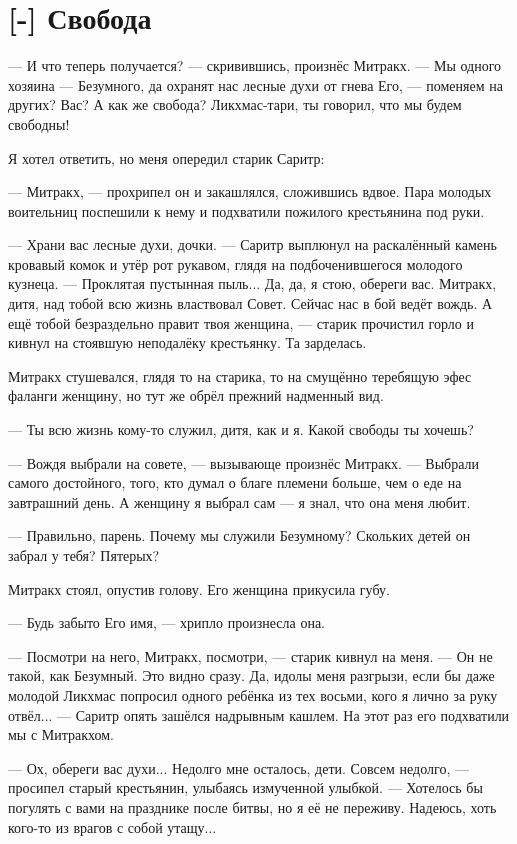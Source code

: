 \section{[-] Свобода}

\textspace

--- И что теперь получается? --- скривившись, произнёс Митракх.
--- Мы одного хозяина --- Безумного, да охранят нас лесные духи от гнева Его, --- поменяем на других?
Вас?
А как же свобода?
Ликхмас-тари, ты говорил, что мы будем свободны!

Я хотел ответить, но меня опередил старик Саритр:

--- Митракх, --- прохрипел он и закашлялся, сложившись вдвое.
Пара молодых воительниц поспешили к нему и подхватили пожилого крестьянина под руки.

--- Храни вас лесные духи, дочки. --- Саритр выплюнул на раскалённый камень кровавый комок и утёр рот рукавом, глядя на подбоченившегося молодого кузнеца.
--- Проклятая пустынная пыль...
Да, да, я стою, обереги вас.
Митракх, дитя, над тобой всю жизнь властвовал Совет.
Сейчас нас в бой ведёт вождь.
А ещё тобой безраздельно правит твоя женщина, --- старик прочистил горло и кивнул на стоявшую неподалёку крестьянку.
Та зарделась.

Митракх стушевался, глядя то на старика, то на смущённо теребящую эфес фаланги женщину, но тут же обрёл прежний надменный вид.

--- Ты всю жизнь кому-то служил, дитя, как и я.
Какой свободы ты хочешь?

--- Вождя выбрали на совете, --- вызывающе произнёс Митракх.
--- Выбрали самого достойного, того, кто думал о благе племени больше, чем о еде на завтрашний день.
А женщину я выбрал сам --- я знал, что она меня любит.

--- Правильно, парень.
Почему мы служили Безумному?
Скольких детей он забрал у тебя?
Пятерых?

Митракх стоял, опустив голову.
Его женщина прикусила губу.

--- Будь забыто Его имя, --- хрипло произнесла она.

--- Посмотри на него, Митракх, посмотри, --- старик кивнул на меня.
--- Он не такой, как Безумный.
Это видно сразу.
Да, идолы меня разгрызи, если бы даже молодой Ликхмас попросил одного ребёнка из тех восьми, кого я лично за руку отвёл... --- Саритр опять зашёлся надрывным кашлем.
На этот раз его подхватили мы с Митракхом.

--- Ох, обереги вас духи...
Недолго мне осталось, дети.
Совсем недолго, --- просипел старый крестьянин, улыбаясь измученной улыбкой.
--- Хотелось бы погулять с вами на празднике после битвы, но я её не переживу.
Надеюсь, хоть кого-то из врагов с собой утащу...

